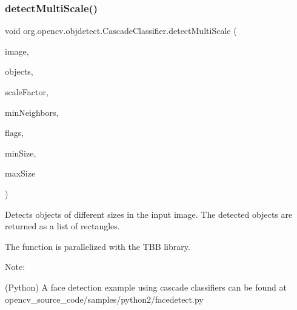 \subsubsection{\texorpdfstring{detect\+Multi\+Scale()}{detectMultiScale()}\hspace{0.1cm}{\footnotesize\ttfamily [1/4]}}
{\footnotesize\ttfamily void org.\+opencv.\+objdetect.\+Cascade\+Classifier.\+detect\+Multi\+Scale (\begin{DoxyParamCaption}\item[{\mbox{\hyperlink{classorg_1_1opencv_1_1core_1_1_mat}{Mat}}}]{image,  }\item[{\mbox{\hyperlink{classorg_1_1opencv_1_1core_1_1_mat_of_rect}{Mat\+Of\+Rect}}}]{objects,  }\item[{double}]{scale\+Factor,  }\item[{int}]{min\+Neighbors,  }\item[{int}]{flags,  }\item[{\mbox{\hyperlink{classorg_1_1opencv_1_1core_1_1_size}{Size}}}]{min\+Size,  }\item[{\mbox{\hyperlink{classorg_1_1opencv_1_1core_1_1_size}{Size}}}]{max\+Size }\end{DoxyParamCaption})}

Detects objects of different sizes in the input image. The detected objects are returned as a list of rectangles.

The function is parallelized with the T\+BB library.

Note\+:


\begin{DoxyItemize}
\item (Python) A face detection example using cascade classifiers can be found at opencv\+\_\+source\+\_\+code/samples/python2/facedetect.\+py 
\end{DoxyItemize}


